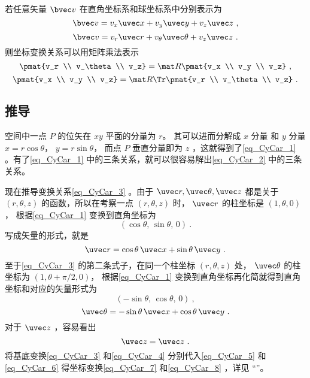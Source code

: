 若任意矢量 $\bvec v$ 在直角坐标系和球坐标系中分别表示为
\begin{equation}\label{eq_CyCar_6}
\bvec v = v_x \uvec x + v_y \uvec y + v_z \uvec z~,
\end{equation}
\begin{equation}\label{eq_CyCar_5}
\bvec v = v_r \uvec r + v_\theta \uvec \theta + v_z \uvec z~.
\end{equation}
则坐标变换关系可以用矩阵乘法表示
\begin{equation}\label{eq_CyCar_8}
\pmat{v_r \\ v_\theta \\ v_z}
= \mat R \pmat{v_x \\ v_y \\ v_z}~,
\end{equation}
\begin{equation}\label{eq_CyCar_7}
\pmat{v_x \\ v_y \\ v_z}
= \mat R\Tr \pmat{v_r \\ v_\theta \\ v_z}~.
\end{equation}
\subsection{推导}
空间中一点 $P$ 的位矢在 $xy$ 平面的分量为 $r$。 其可以进而分解成 $x$ 分量 和 $y$ 分量  $x = r\cos \theta$，  $y = r\sin \theta$， 而点 $P$ 垂直分量即为 $z$ ，这就得到了\autoref{eq_CyCar_1} 。有了\autoref{eq_CyCar_1} 中的三条关系，就可以很容易解出\autoref{eq_CyCar_2} 中的三条关系。

现在推导变换关系\autoref{eq_CyCar_3} 。由于 $\uvec r,\uvec \theta ,\uvec z $ 都是关于 $(r, \theta, z)$ 的函数，所以在考察一点 $(r, \theta, z)$ 时， $\uvec r$ 的柱坐标是 $(1, \theta, 0)$，  根据\autoref{eq_CyCar_1} 变换到直角坐标为
\begin{equation}
(\cos \theta,\,\sin \theta,\,0)~.
\end{equation}
写成矢量的形式，就是
 \begin{equation}
\uvec r = \cos \theta \,\uvec x + \sin \theta \,\uvec y ~.
\end{equation}
至于\autoref{eq_CyCar_3} 的第二条式子，在同一个柱坐标 $(r,\theta ,z)$ 处， $\uvec \theta $ 的柱坐标为 $(1, \theta + \pi /2, 0)$， 根据\autoref{eq_CyCar_1} 变换到直角坐标再化简就得到直角坐标和对应的矢量形式为
\begin{equation}
(-\sin \theta ,\,\cos \theta , \,0)~,
\end{equation}
\begin{equation}
\uvec \theta  = -\sin \theta  \,\uvec x + \cos \theta \,\uvec y~.
\end{equation}
对于 $\uvec z$ ，容易看出
\begin{equation}
\uvec z = \uvec z~.
\end{equation}
将基底变换\autoref{eq_CyCar_3}  和\autoref{eq_CyCar_4} 分别代入\autoref{eq_CyCar_5}  和\autoref{eq_CyCar_6} 得坐标变换\autoref{eq_CyCar_7} 和\autoref{eq_CyCar_8} ，详见 “”。

